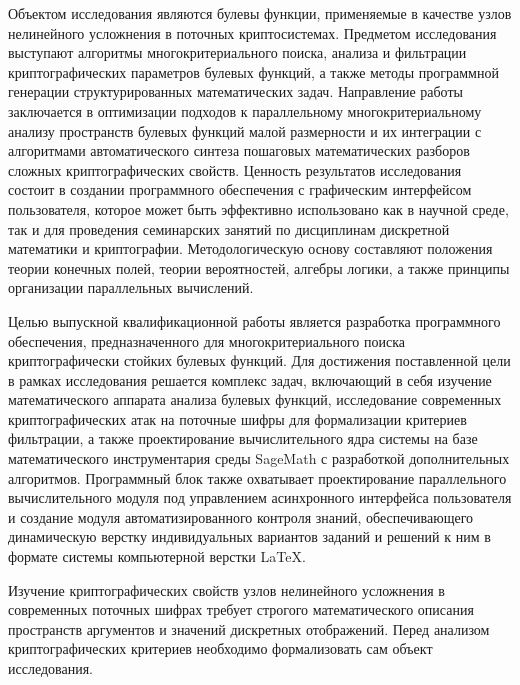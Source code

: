 \documentclass[14pt, a4paper]{extarticle}
\begin{document}
Объектом исследования являются булевы функции,
применяемые в качестве узлов нелинейного усложнения в поточных криптосистемах.
Предметом исследования выступают алгоритмы многокритериального поиска,
анализа и фильтрации криптографических параметров булевых функций,
а также методы программной генерации структурированных математических задач.
Направление работы заключается в оптимизации подходов к параллельному многокритериальному анализу пространств булевых функций малой размерности
и их интеграции с алгоритмами автоматического синтеза пошаговых математических разборов сложных криптографических свойств.
Ценность результатов исследования состоит в создании программного обеспечения с графическим интерфейсом пользователя,
которое может быть эффективно использовано как в научной среде,
так и для проведения семинарских занятий по дисциплинам дискретной математики и криптографии.
Методологическую основу составляют положения теории конечных полей,
теории вероятностей, алгебры логики, а также принципы организации параллельных вычислений.

Целью выпускной квалификационной работы является разработка программного обеспечения,
предназначенного для многокритериального поиска криптографически стойких булевых функций.
Для достижения поставленной цели в рамках исследования решается комплекс задач,
включающий в себя изучение математического аппарата анализа булевых функций,
исследование современных криптографических атак на поточные шифры для формализации критериев фильтрации,
а также проектирование вычислительного ядра системы на базе математического инструментария среды SageMath
с разработкой дополнительных алгоритмов.
Программный блок также охватывает проектирование параллельного вычислительного модуля
под управлением асинхронного интерфейса пользователя
и создание модуля автоматизированного контроля знаний,
обеспечивающего динамическую верстку индивидуальных вариантов заданий и решений к ним в формате системы компьютерной верстки \LaTeX.

\newpage
{}
\vspace{1em}

Изучение криптографических свойств узлов нелинейного усложнения
в современных поточных шифрах требует строгого математического описания пространств аргументов и значений дискретных отображений.
Перед анализом криптографических критериев необходимо формализовать сам объект исследования.
\end{document}
